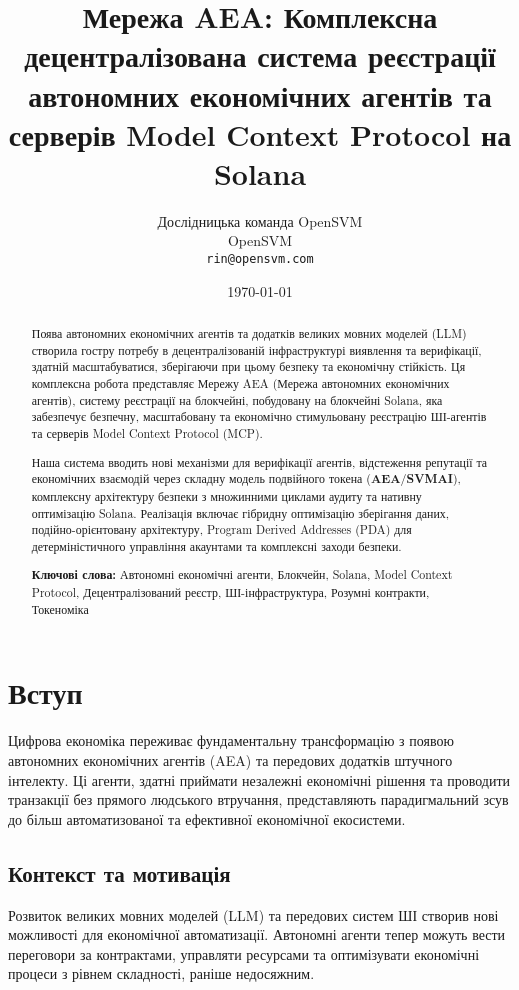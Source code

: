\documentclass[12pt,a4paper]{article}
\title{Мережа AEA: Комплексна децентралізована система реєстрації автономних економічних агентів та серверів Model Context Protocol на Solana}
\author{Дослідницька команда OpenSVM\\
OpenSVM\\
\texttt{rin@opensvm.com}}
\date{\today}
\begin{document}
\maketitle

\begin{abstract}
Поява автономних економічних агентів та додатків великих мовних моделей (LLM) створила гостру потребу в децентралізованій інфраструктурі виявлення та верифікації, здатній масштабуватися, зберігаючи при цьому безпеку та економічну стійкість. Ця комплексна робота представляє Мережу AEA (Мережа автономних економічних агентів), систему реєстрації на блокчейні, побудовану на блокчейні Solana, яка забезпечує безпечну, масштабовану та економічно стимульовану реєстрацію ШІ-агентів та серверів Model Context Protocol (MCP).

Наша система вводить нові механізми для верифікації агентів, відстеження репутації та економічних взаємодій через складну модель подвійного токена (\textbf{AEA}/\textbf{SVMAI}), комплексну архітектуру безпеки з множинними циклами аудиту та нативну оптимізацію Solana. Реалізація включає гібридну оптимізацію зберігання даних, подійно-орієнтовану архітектуру, Program Derived Addresses (PDA) для детерміністичного управління акаунтами та комплексні заходи безпеки.

\textbf{Ключові слова:} Автономні економічні агенти, Блокчейн, Solana, Model Context Protocol, Децентралізований реєстр, ШІ-інфраструктура, Розумні контракти, Токеноміка
\end{abstract}

\newpage
\tableofcontents
\newpage

\section{Вступ}

Цифрова економіка переживає фундаментальну трансформацію з появою автономних економічних агентів (AEA) та передових додатків штучного інтелекту. Ці агенти, здатні приймати незалежні економічні рішення та проводити транзакції без прямого людського втручання, представляють парадигмальний зсув до більш автоматизованої та ефективної економічної екосистеми.

\subsection{Контекст та мотивація}

Розвиток великих мовних моделей (LLM) та передових систем ШІ створив нові можливості для економічної автоматизації. Автономні агенти тепер можуть вести переговори за контрактами, управляти ресурсами та оптимізувати економічні процеси з рівнем складності, раніше недосяжним.
\end{document}
